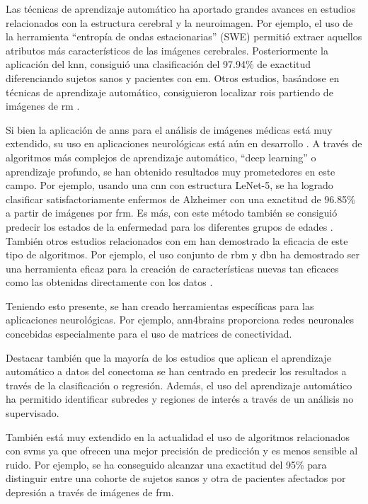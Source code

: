 Las técnicas de aprendizaje automático ha aportado grandes avances en estudios relacionados con la estructura cerebral y la neuroimagen. Por ejemplo, \cite{Zhang2016ComparisonMachine} el uso de la herramienta ``entropía de ondas estacionarias'' (SWE) permitió extraer aquellos  atributos más característicos de las imágenes cerebrales. Posteriormente la aplicación del \gls{knn}, consiguió una clasificación del 97.94\% de exactitud diferenciando sujetos sanos y pacientes con \gls{em}. Otros estudios, basándose en  técnicas de aprendizaje automático, consiguieron localizar \glspl{roi} partiendo de imágenes de \gls{rm} \cite{Desikan2006AnInterest}.

Si bien la aplicación de \glspl{ann} para el análisis de imágenes médicas está muy extendido, su uso en aplicaciones neurológicas está aún en desarrollo \cite{Ciresan2013MitosisNetworks} \cite{Ciresan2012DeepImages}. A través de algoritmos más complejos de aprendizaje automático, ``deep learning'' o aprendizaje profundo, se han obtenido resultados muy prometedores en este campo. Por ejemplo, usando una \gls{cnn} con estructura LeNet-5, se ha logrado clasificar  satisfactoriamente enfermos de Alzheimer con una exactitud de 96.85\% a partir de imágenes por \gls{frm}. Es más, con este método también se consiguió predecir los estados de la enfermedad para los diferentes grupos de edades \cite{Sarraf2016ClassificationNetworks}. También otros estudios relacionados con \gls{em} han demostrado la eficacia de este tipo de algoritmos. Por ejemplo, el uso conjunto de \gls{rbm} y \gls{dbn}  ha demostrado ser una herramienta eficaz para la creación de características nuevas tan eficaces como las obtenidas directamente con los datos \cite{Yoo2014DeepSegmentation}.


Teniendo esto presente, se han creado herramientas específicas para las aplicaciones neurológicas. Por ejemplo, ann4brains \cite{Kawahara2017BrainNetCNN:Neurodevelopment} proporciona redes neuronales concebidas especialmente para el uso de matrices de conectividad. 

Destacar también que la mayoría de los estudios que aplican el aprendizaje automático a datos del conectoma se han centrado en predecir los resultados a través de la clasificación o regresión. Además, el uso del aprendizaje automático ha permitido identificar subredes y regiones de interés a través de un análisis no supervisado.

También está muy extendido en la actualidad el uso de algoritmos relacionados con \glspl{svm} \cite{HamarnehsGroup} ya que ofrecen una mejor precisión de predicción y es menos sensible al ruido. Por ejemplo, \cite{Craddock2009DiseaseConnectivity} se ha conseguido alcanzar una exactitud del 95\% para distinguir entre una cohorte de sujetos sanos y otra de pacientes afectados por depresión a través de imágenes de \gls{frm}.

